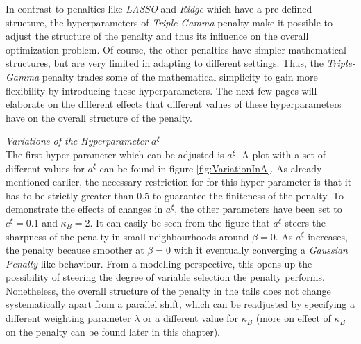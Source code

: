 \documentclass[12pt,a4paper]{article}
\begin{document}
In contrast to penalties like \textit{LASSO} and \textit{Ridge} which have a pre-defined structure, the hyperparameters of \textit{Triple-Gamma} penalty make it possible to adjust the structure of the penalty and thus its influence on the overall optimization problem. Of course, the other penalties have simpler mathematical structures, but are very limited in adapting to different settings. Thus, the \textit{Triple-Gamma} penalty trades some of the mathematical simplicity to gain more flexibility by introducing these hyperparameters. The next few pages will elaborate on the different effects that different values of these hyperparameters have on the overall structure of the penalty.    

\newpage

\textit{Variations of the Hyperparameter $a^\xi$}\\

The first hyper-parameter which can be adjusted is $a^\xi$. A plot with a set of different values for $a^\xi$ can be found in figure \ref{fig:VariationInA}. As already mentioned earlier, the necessary restriction for for this hyper-parameter is that it has to be strictly greater than $0.5$ to guarantee the finiteness of the penalty. To demonstrate the effects of changes in $a^\xi$, the other parameters have been set to $c^\xi=0.1$ and $\kappa_B=2$. It can easily be seen from the figure that $a^\xi$ steers the sharpness of the penalty in small neighbourhoods around $\beta=0$. As $a^\xi$ increases, the penalty because smoother at $\beta=0$ with it eventually converging a \textit{Gaussian Penalty} like behaviour. From a modelling perspective, this opens up the possibility of steering the degree of variable selection the penalty performs. Nonetheless, the overall structure of the penalty in the tails does not change systematically apart from a parallel shift, which can be readjusted by specifying a different weighting parameter $\lambda$ or a different value for $\kappa_B$ (more on effect of $\kappa_B$ on the penalty can be found later in this chapter).\\ 
\end{document}
